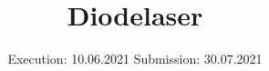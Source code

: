 

\subject{V60}
\title{Diodelaser}
\date{%
  Execution: 10.06.2021
  \hspace{3em}
  Submission: 30.07.2021
}



\maketitle
\thispagestyle{empty}
\tableofcontents
\newpage








\printbibliography{}


